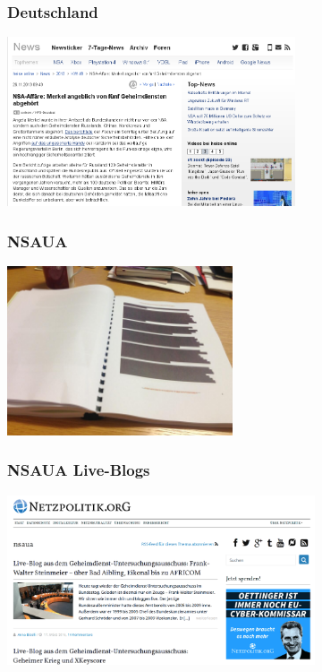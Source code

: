 \documentclass[12pt, xcolor={svgnames,table}]{beamer}
\begin{document}
\begin{frame}
  \frametitle{Deutschland}
    \begin{center}
      \includegraphics[height=5cm]{img/heise-merkel.png}
    \end{center}
\end{frame}

\begin{frame}
  \frametitle{NSAUA}
    \begin{center}
      \includegraphics[height=5cm]{img/nsa-ua-akte.jpg}
    \end{center}
\end{frame}

\begin{frame}
  \frametitle{NSAUA Live-Blogs}
    \begin{center}
      \includegraphics[height=5cm]{img/nsa-ua-netzpolitik.png}
    \end{center}
\end{frame}
\end{document}
